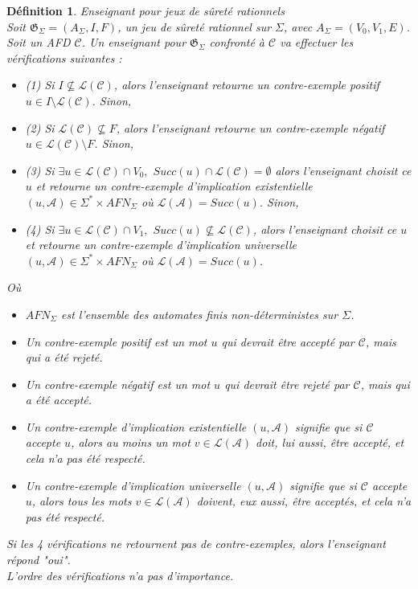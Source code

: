 \documentclass[12pt,a4paper,oneside,titlepage]{report}
\newtheorem{defi}{D\'efinition}[section]
\begin{document}
\begin{defi}{Enseignant pour jeux de sûreté rationnels\\}
\label{teacher}
Soit $\mathfrak{G}_\Sigma=(A_\Sigma, I, F)$, un jeu de sûreté rationnel sur $\Sigma$, avec $A_\Sigma=(V_0,V_1,E)$. Soit un AFD $\mathcal{C}$. Un enseignant pour $\mathfrak{G}_\Sigma$ confronté à $\mathcal{C}$ va effectuer les vérifications suivantes :\\
\begin{itemize}
\item (1) Si $I\nsubseteq \mathcal{L}(\mathcal{C})$, alors l'enseignant retourne un \emph{contre-exemple positif} $u\in I\setminus \mathcal{L}(\mathcal{C})$. Sinon,
\item (2) Si $\mathcal{L}(\mathcal{C}) \nsubseteq F$, alors l'enseignant retourne un \emph{contre-exemple négatif} $u\in \mathcal{L}(\mathcal{C})\setminus F$. Sinon, 
\item (3) Si $\exists u\in \mathcal{L}(\mathcal{C})\cap V_0,$ $Succ(u)\cap \mathcal{L}(\mathcal{C})=\emptyset$ alors l'enseignant choisit ce $u$ et retourne un \emph{contre-exemple d'implication existentielle} $(u, \mathcal{A})\in \Sigma^* \times AFN_\Sigma$ où $\mathcal{L}(\mathcal{A})=Succ(u)$. Sinon, 
\item (4) Si $\exists u\in \mathcal{L}(\mathcal{C})\cap V_1,$ $Succ(u)\nsubseteq \mathcal{L}(\mathcal{C})$, alors l'enseignant choisit ce $u$ et retourne un \emph{contre-exemple d'implication universelle} $(u, \mathcal{A})\in \Sigma^* \times AFN_\Sigma$ où $\mathcal{L}(\mathcal{A})=Succ(u)$.
\end{itemize}
Où 
\begin{itemize}
\item $AFN_\Sigma$ est l'ensemble des automates finis non-déterministes sur $\Sigma$.
\item Un \emph{contre-exemple positif} est un mot $u$ qui devrait être accepté par $\mathcal{C}$, mais qui a été rejeté.
\item Un \emph{contre-exemple négatif} est un mot $u$ qui devrait être rejeté par $\mathcal{C}$, mais qui a été accepté.
\item Un \emph{contre-exemple d'implication existentielle} $(u, \mathcal{A})$ signifie que si $\mathcal{C}$ accepte $u$, alors au moins un mot $v \in \mathcal{L}(\mathcal{A})$ doit, lui aussi, être accepté, et cela n'a pas été respecté.
\item Un \emph{contre-exemple d'implication universelle} $(u, \mathcal{A})$ signifie que si $\mathcal{C}$ accepte $u$, alors tous les mots $v \in \mathcal{L}(\mathcal{A})$ doivent, eux aussi, être acceptés, et cela n'a pas été respecté.\\
\end{itemize}
\noindent Si les 4 vérifications ne retournent pas de contre-exemples, alors l'enseignant répond "\emph{oui}".\\
L'ordre des vérifications n'a pas d'importance.
\end{defi}
\end{document}
